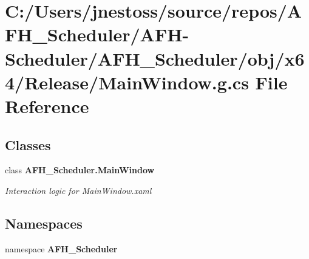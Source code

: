 \section{C\+:/\+Users/jnestoss/source/repos/\+A\+F\+H\+\_\+\+Scheduler/\+A\+F\+H-\/\+Scheduler/\+A\+F\+H\+\_\+\+Scheduler/obj/x64/\+Release/\+Main\+Window.g.\+cs File Reference}
\label{x64_2_release_2_main_window_8g_8cs}
\subsection*{Classes}
\begin{DoxyCompactItemize}
\item 
class \textbf{ A\+F\+H\+\_\+\+Scheduler.\+Main\+Window}
\begin{DoxyCompactList}\small\item\em Interaction logic for Main\+Window.\+xaml \end{DoxyCompactList}\end{DoxyCompactItemize}
\subsection*{Namespaces}
\begin{DoxyCompactItemize}
\item 
namespace \textbf{ A\+F\+H\+\_\+\+Scheduler}
\end{DoxyCompactItemize}
